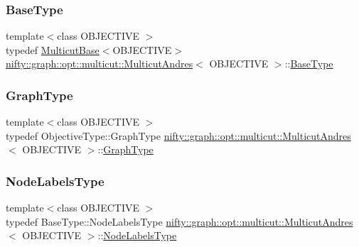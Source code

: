 \subsubsection{\texorpdfstring{Base\+Type}{BaseType}}
{\footnotesize\ttfamily template$<$class O\+B\+J\+E\+C\+T\+I\+VE $>$ \\
typedef \hyperlink{classnifty_1_1graph_1_1opt_1_1multicut_1_1MulticutBase}{Multicut\+Base}$<$O\+B\+J\+E\+C\+T\+I\+VE$>$ \hyperlink{classnifty_1_1graph_1_1opt_1_1multicut_1_1MulticutAndres}{nifty\+::graph\+::opt\+::multicut\+::\+Multicut\+Andres}$<$ O\+B\+J\+E\+C\+T\+I\+VE $>$\+::\hyperlink{classnifty_1_1graph_1_1opt_1_1multicut_1_1MulticutAndres_ad9aa4942dd45186f3a2ebb38d42876e5}{Base\+Type}}

\mbox{\label{classnifty_1_1graph_1_1opt_1_1multicut_1_1MulticutAndres_adb1adbc514b266aaffc1f7219682966e}} 
\subsubsection{\texorpdfstring{Graph\+Type}{GraphType}}
{\footnotesize\ttfamily template$<$class O\+B\+J\+E\+C\+T\+I\+VE $>$ \\
typedef Objective\+Type\+::\+Graph\+Type \hyperlink{classnifty_1_1graph_1_1opt_1_1multicut_1_1MulticutAndres}{nifty\+::graph\+::opt\+::multicut\+::\+Multicut\+Andres}$<$ O\+B\+J\+E\+C\+T\+I\+VE $>$\+::\hyperlink{classnifty_1_1graph_1_1opt_1_1multicut_1_1MulticutAndres_adb1adbc514b266aaffc1f7219682966e}{Graph\+Type}}

\mbox{\label{classnifty_1_1graph_1_1opt_1_1multicut_1_1MulticutAndres_a6cd9d64abc4a98aa9745ce1ef0d4ecfe}} 
\subsubsection{\texorpdfstring{Node\+Labels\+Type}{NodeLabelsType}}
{\footnotesize\ttfamily template$<$class O\+B\+J\+E\+C\+T\+I\+VE $>$ \\
typedef Base\+Type\+::\+Node\+Labels\+Type \hyperlink{classnifty_1_1graph_1_1opt_1_1multicut_1_1MulticutAndres}{nifty\+::graph\+::opt\+::multicut\+::\+Multicut\+Andres}$<$ O\+B\+J\+E\+C\+T\+I\+VE $>$\+::\hyperlink{classnifty_1_1graph_1_1opt_1_1multicut_1_1MulticutAndres_a6cd9d64abc4a98aa9745ce1ef0d4ecfe}{Node\+Labels\+Type}}

